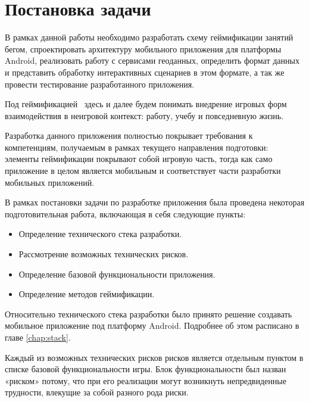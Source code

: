 \chapter{Постановка задачи}
В рамках данной работы необходимо разработать схему геймификации занятий бегом, спроектировать архитектуру мобильного приложения для платформы Android, реализовать работу с сервисами геоданных, определить формат данных и представить обработку интерактивных сценариев в этом формате, а так же провести тестирование разработанного приложения.

Под геймификацией~\autocite{gamification} здесь и далее будем понимать внедрение игровых форм взаимодействия в неигровой контекст: работу, учебу и повседневную жизнь.

Разработка данного приложения полностью покрывает требования к компетенциям, получаемым в рамках текущего направления подготовки: элементы геймификации покрывают собой игровую часть, тогда как само приложение в целом является мобильным и соответствует части разработки мобильных приложений.

В рамках постановки задачи по разработке приложения была проведена некоторая подготовительная работа, включающая в себя следующие пункты:
\begin{itemize}
	\item Определение технического стека разработки.
	\item Рассмотрение возможных технических рисков.
	\item Определение базовой функциональности приложения.
	\item Определение методов геймификации.
\end{itemize}
\smallskip
Относительно технического стека разработки было принято решение создавать мобильное приложение под платформу Android. Подробнее об этом расписано в главе \autoref{chap:stack}.


Каждый из возможных технических рисков рисков является отдельным пунктом в списке базовой функциональности игры. Блок функциональности был назван «риском» потому, что при его реализации могут возникнуть непредвиденные трудности, влекущие за собой разного рода риски.

